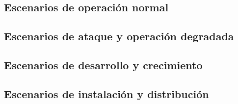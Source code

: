 \subsection{Escenarios de operación normal}






\subsection{Escenarios de ataque y operación degradada}








\subsection{Escenarios de desarrollo y crecimiento}









\subsection{Escenarios de instalación y distribución}




